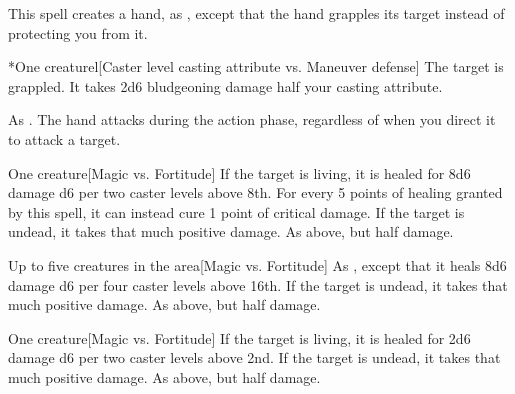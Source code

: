 \spellrng{\rngmed}
\spelldur{\durshort \dismissable}
\spellline
\spelleffect This spell creates a hand, as , except that the hand grapples its target instead of protecting you from it.
\begin{spelltarget}*{One creature}l[Caster level \add casting attribute vs. Maneuver defense]
    \spellsuccess The target is grappled. It takes 2d6 bludgeoning damage \add half your casting attribute.
\end{spelltarget}
\spellnotes As . The hand attacks during the action phase, regardless of when you direct it to attack a target.

\spellrng{\rngclose}
\begin{spelltarget}{One creature}[Magic vs. Fortitude]
    \spelleffect If the target is living, it is healed for 8d6 damage \add d6 per two caster levels above 8th. For every 5 points of healing granted by this spell, it can instead cure 1 point of critical damage.
    \spellsuccess If the target is undead, it takes that much positive damage.
    \spellfailure As above, but half damage.
\end{spelltarget}

\spellrng{\rngclose}
\begin{spelltargets}{Up to five creatures in the area}[Magic vs. Fortitude]
    \spelleffect As , except that it heals 8d6 damage \add d6 per four caster levels above 16th.
    \spellsuccess If the target is undead, it takes that much positive damage.
    \spellfailure As above, but half damage.
\end{spelltargets}

\spellrng{\rngclose}
\begin{spelltarget}{One creature}[Magic vs. Fortitude]
    \spelleffect If the target is living, it is healed for 2d6 damage \add d6 per two caster levels above 2nd.
    \spellsuccess If the target is undead, it takes that much positive damage.
    \spellfailure As above, but half damage.
\end{spelltarget}

